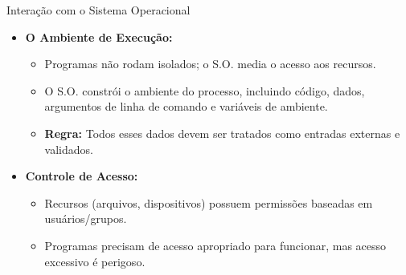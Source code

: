 \begin{frame}{Interação com o Sistema Operacional}
    \begin{itemize}
        \item \textbf{O Ambiente de Execução:}
              \begin{itemize}
                  \item Programas não rodam isolados; o S.O. media o acesso aos recursos.
                  \item O S.O. constrói o ambiente do processo, incluindo código, dados, argumentos de linha de comando e variáveis de ambiente.
                  \item \textbf{Regra:} Todos esses dados devem ser tratados como entradas externas e validados.
              \end{itemize}

        \item \textbf{Controle de Acesso:}
              \begin{itemize}
                  \item Recursos (arquivos, dispositivos) possuem permissões baseadas em usuários/grupos.
                  \item Programas precisam de acesso apropriado para funcionar, mas acesso excessivo é perigoso.
              \end{itemize}
    \end{itemize}
\end{frame}

